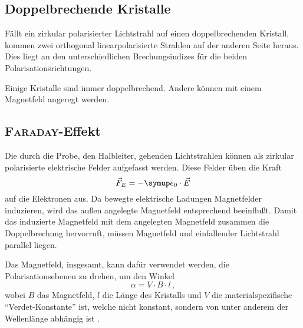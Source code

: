 \subsection{Doppelbrechende Kristalle}
Fällt ein zirkular polarisierter Lichtstrahl auf einen doppelbrechenden
Kristall, kommen zwei orthogonal linearpolarisierte Strahlen auf der anderen
Seite heraus.
Dies liegt an den unterschiedlichen Brechungsindizes für die beiden
Polarisationsrichtungen.

Einige Kristalle sind immer doppelbrechend.
Andere können mit einem Magnetfeld angeregt werden.

\subsection{\textsc{Faraday}-Effekt}
\label{sec:1.4}
Die durch die Probe, den Halbleiter, gehenden Lichtstrahlen können als
zirkular polarisierte elektrische Felder aufgefasst werden.
Diese Felder üben die Kraft
\begin{equation*}
  \vec{F}_E = - \me_0 \cdot \vec{E}
\end{equation*}
auf die Elektronen aus.
Da bewegte elektrische Ladungen Magnetfelder induzieren,
wird das außen angelegte Magnetfeld entsprechend beeinflußt.
Damit das induzierte Magnetfeld mit dem angelegten Magnetfeld zusammen
die Doppelbrechung hervorruft, müssen Magnetfeld und einfallender Lichtstrahl parallel liegen.

Das Magnetfeld, insgesamt, kann dafür verwendet werden, die Polarisationsebenen
zu drehen, um den Winkel
\begin{equation*}
  α = V \cdot B \cdot l\,,
\end{equation*}
wobei $B$ das Magnetfeld, $l$ die Länge des Kristalls und $V$ die
materialspezifische \enquote{Verdet-Konstante} ist, welche nicht konstant,
sondern von unter anderem der Wellenlänge abhängig ist \cite{heintze}.

